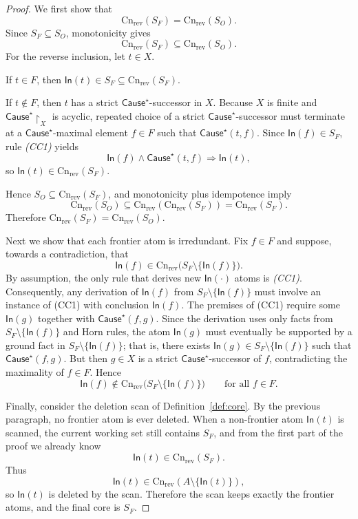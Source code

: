 \documentclass[10pt,a4paper]{amsart}
\newcommand{\Cn}{\mathrm{Cn}}
\begin{document}
\begin{proof}
We first show that
\[
\Cn_{\mathrm{rev}}(S_F)=\Cn_{\mathrm{rev}}(S_O).
\]
Since \(S_F\subseteq S_O\), monotonicity gives
\[
\Cn_{\mathrm{rev}}(S_F)\subseteq \Cn_{\mathrm{rev}}(S_O).
\]
For the reverse inclusion, let \(t\in X\).

If \(t\in F\), then \(\mathsf{In}(t)\in S_F\subseteq \Cn_{\mathrm{rev}}(S_F)\).

If \(t\notin F\), then \(t\) has a strict \(\mathsf{Cause}^\star\)-successor in \(X\).
Because \(X\) is finite and \(\mathsf{Cause}^\star\!\upharpoonright_X\) is acyclic, repeated choice of a strict
\(\mathsf{Cause}^\star\)-successor must terminate at a \(\mathsf{Cause}^\star\)-maximal element \(f\in F\) such that
\(\mathsf{Cause}^\star(t,f)\).
Since \(\mathsf{In}(f)\in S_F\), rule \emph{(CC1)} yields
\[
\mathsf{In}(f)\wedge \mathsf{Cause}^\star(t,f)\Rightarrow \mathsf{In}(t),
\]
so \(\mathsf{In}(t)\in \Cn_{\mathrm{rev}}(S_F)\).

Hence \(S_O\subseteq \Cn_{\mathrm{rev}}(S_F)\), and monotonicity plus idempotence imply
\[
\Cn_{\mathrm{rev}}(S_O)\subseteq \Cn_{\mathrm{rev}}(\Cn_{\mathrm{rev}}(S_F))=\Cn_{\mathrm{rev}}(S_F).
\]
Therefore \(\Cn_{\mathrm{rev}}(S_F)=\Cn_{\mathrm{rev}}(S_O)\).

Next we show that each frontier atom is irredundant.
Fix \(f\in F\) and suppose, towards a contradiction, that
\[
\mathsf{In}(f)\in \Cn_{\mathrm{rev}}\bigl(S_F\setminus\{\mathsf{In}(f)\}\bigr).
\]
By assumption, the only rule that derives new \(\mathsf{In}(\cdot)\) atoms is \emph{(CC1)}.
Consequently, any derivation of \(\mathsf{In}(f)\) from \(S_F\setminus\{\mathsf{In}(f)\}\) must
involve an instance of (CC1) with conclusion \(\mathsf{In}(f)\).  The premises of (CC1) require
some \(\mathsf{In}(g)\) together with \(\mathsf{Cause}^\star(f,g)\).  Since the derivation
uses only facts from \(S_F\setminus\{\mathsf{In}(f)\}\) and Horn rules, the atom
\(\mathsf{In}(g)\) must eventually be supported by a ground fact in
\(S_F\setminus\{\mathsf{In}(f)\}\); that is, there exists
\(\mathsf{In}(g)\in S_F\setminus\{\mathsf{In}(f)\}\) such that
\(\mathsf{Cause}^\star(f,g)\).  But then \(g\in X\) is a strict
\(\mathsf{Cause}^\star\)-successor of \(f\), contradicting the maximality of \(f\in F\).
Hence
\[
\mathsf{In}(f)\notin \Cn_{\mathrm{rev}}\bigl(S_F\setminus\{\mathsf{In}(f)\}\bigr)
\qquad\text{for all } f\in F.
\]

Finally, consider the deletion scan of Definition~\ref{def:core}.
By the previous paragraph, no frontier atom is ever deleted.
When a non-frontier atom \(\mathsf{In}(t)\) is scanned, the current working set still contains \(S_F\), and from the first part
of the proof we already know
\[
\mathsf{In}(t)\in \Cn_{\mathrm{rev}}(S_F).
\]
Thus
\[
\mathsf{In}(t)\in \Cn_{\mathrm{rev}}(A\setminus\{\mathsf{In}(t)\}),
\]
so \(\mathsf{In}(t)\) is deleted by the scan.
Therefore the scan keeps exactly the frontier atoms, and the final core is \(S_F\).
\end{proof}
\end{document}
